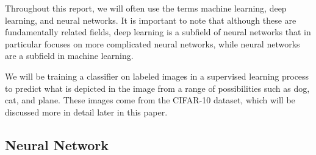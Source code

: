 \documentclass[12pt]{article}
\begin{document}
Throughout this report, we will often use the terms machine learning, deep learning, and neural networks. It is important to note that although these are fundamentally related fields, deep learning is a subfield of neural networks that in particular focuses on more complicated neural networks, while neural networks are a subfield in machine learning. 

We will be training a classifier on labeled images in a supervised learning process to predict what is depicted in the image from a range of possibilities such as dog, cat, and plane. These images come from the CIFAR-10 dataset, which will be discussed more in detail later in this paper.



	
\subsection{Neural Network}
\end{document}
